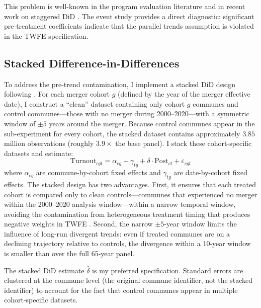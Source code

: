 \documentclass[12pt]{article}
\begin{document}
This problem is well-known in the program evaluation literature \citep{ashenfelter1978estimating, heckman1999economics} and in recent work on staggered DiD \citep{goodmanbacon2021difference, callaway2021difference}. The event study provides a direct diagnostic: significant pre-treatment coefficients indicate that the parallel trends assumption is violated in the TWFE specification.

\subsection{Stacked Difference-in-Differences}

To address the pre-trend contamination, I implement a stacked DiD design following \citet{baker2022staggered}. For each merger cohort $g$ (defined by the year of the merger effective date), I construct a ``clean'' dataset containing only cohort $g$ communes and control communes---those with no merger during 2000--2020---with a symmetric window of $\pm 5$ years around the merger. Because control communes appear in the sub-experiment for every cohort, the stacked dataset contains approximately $3.85$ million observations (roughly $3.9\times$ the base panel). I stack these cohort-specific datasets and estimate:
\begin{equation}
\label{eq:stacked}
    \text{Turnout}_{cgt} = \alpha_{cg} + \gamma_{tg} + \delta \cdot \text{Post}_{ct} + \varepsilon_{cgt}
\end{equation}
where $\alpha_{cg}$ are commune-by-cohort fixed effects and $\gamma_{tg}$ are date-by-cohort fixed effects. The stacked design has two advantages. First, it ensures that each treated cohort is compared only to clean controls---communes that experienced no merger within the 2000--2020 analysis window---within a narrow temporal window, avoiding the contamination from heterogeneous treatment timing that produces negative weights in TWFE \citep{goodmanbacon2021difference}. Second, the narrow $\pm 5$-year window limits the influence of long-run divergent trends: even if treated communes are on a declining trajectory relative to controls, the divergence within a 10-year window is smaller than over the full 65-year panel.

The stacked DiD estimate $\hat{\delta}$ is my preferred specification. Standard errors are clustered at the commune level (the original commune identifier, not the stacked identifier) to account for the fact that control communes appear in multiple cohort-specific datasets.
\end{document}
